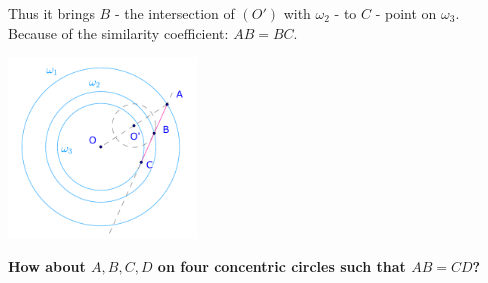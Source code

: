 \documentclass[8pt,xcolor=table,dvipsnames]{beamer}
\begin{document}
\begin{frame}[t]
\begin{overprint}
        \bigbreak
        Thus it brings $B$ - the intersection of $(O')$ with $\omega_2$ - to $C$ - point on $\omega_3$.
        Because of the similarity coefficient: $AB=BC.$
        \begin{center}
            \includegraphics[width=5cm]{./svg/pdf/homothety-p4c.pdf}
        \end{center}

        \textbf{How about $A, B, C, D$ on four concentric circles such that $AB=CD$?} 
    \end{overprint}
\end{frame}
\end{document}
